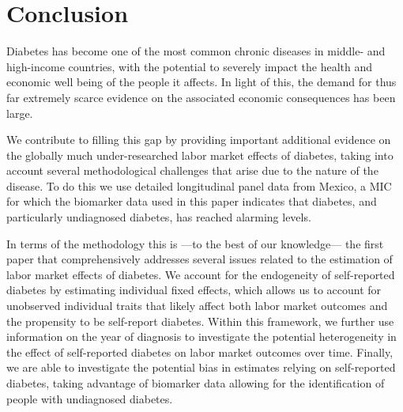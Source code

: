 \documentclass[12pt,english]{article}
\begin{document}
\section{\label{sec:Conclusion}Conclusion}

Diabetes has become one of the most common chronic diseases in middle- and high-income countries, with the potential to severely impact the health and economic well being of the people it affects.  In light of this, the demand for thus far extremely scarce evidence on the associated economic consequences has been large. 

We contribute to filling this gap by providing important additional evidence on the globally much under-researched labor market effects of diabetes, taking into account several methodological challenges that arise due to the nature of the disease. To do this we use detailed longitudinal panel data from Mexico, a \ac{MIC} for which the biomarker data used in this paper indicates that diabetes, and particularly undiagnosed diabetes, has reached alarming levels.

In terms of the methodology this is ---to the best of our knowledge--- the first paper that comprehensively addresses several issues related to the estimation of labor market effects of diabetes. We account for the endogeneity of self-reported diabetes by estimating individual fixed effects, which allows us to account for unobserved individual traits that likely affect both labor market outcomes and the propensity to be self-report diabetes. Within this framework, we further use information on the year of diagnosis to investigate the potential heterogeneity in the effect of self-reported diabetes on labor market outcomes over time. Finally, we are able to investigate the potential bias in estimates relying on self-reported diabetes, taking advantage of biomarker data allowing for the identification of people with undiagnosed diabetes. 
\end{document}

